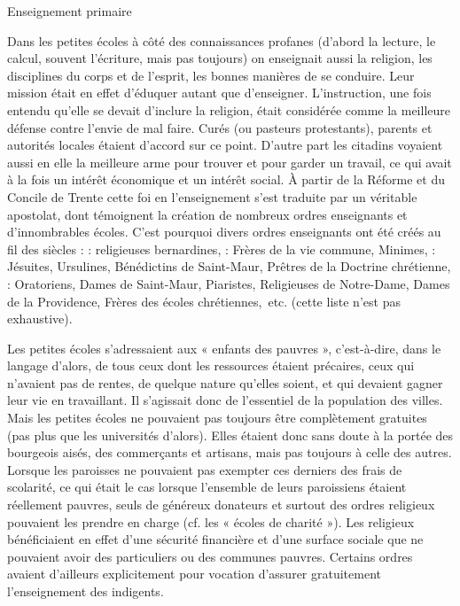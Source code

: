 Enseignement primaire

Dans les petites écoles à côté des connaissances profanes (d'abord la lecture, le calcul, souvent l'écriture, mais pas toujours) on enseignait aussi la religion, les disciplines du corps et de l'esprit, les bonnes manières de se conduire. Leur mission était en effet d'éduquer autant que d'enseigner. L'instruction, une fois entendu qu'elle se devait d'inclure la religion, était considérée comme la meilleure défense contre l'envie de mal faire. Curés (ou pasteurs protestants), parents et autorités locales étaient d'accord sur ce point. D'autre part les citadins voyaient aussi en elle la meilleure arme pour trouver et pour garder un travail, ce qui avait à la fois un intérêt économique et un intérêt social. À partir de la Réforme et du Concile de Trente cette foi en l'enseignement s'est traduite par un véritable apostolat, dont témoignent la création de nombreux ordres enseignants et d'innombrables écoles. C'est pourquoi divers ordres enseignants ont été créés au fil des siècles :
 : religieuses bernardines,
 : Frères de la vie commune, Minimes,
 : Jésuites, Ursulines, Bénédictins de Saint-Maur, Prêtres de la Doctrine chrétienne,
 : Oratoriens, Dames de Saint-Maur, Piaristes, Religieuses de Notre-Dame, Dames de la Providence, Frères des écoles chrétiennes,~etc. (cette liste n'est pas exhaustive).

 Les petites écoles s'adressaient aux « enfants des pauvres », c'est-à-dire, dans le langage d'alors, de tous ceux dont les ressources étaient précaires, ceux qui n'avaient pas de rentes, de quelque nature qu'elles soient, et qui devaient gagner leur vie en travaillant. Il s'agissait donc de l'essentiel de la population des villes. Mais les petites écoles ne pouvaient pas toujours être complètement gratuites (pas plus que les universités d'alors). Elles étaient donc sans doute à la portée des bourgeois aisés, des commerçants et artisans, mais pas toujours à celle des autres. Lorsque les paroisses ne pouvaient pas exempter ces derniers des frais de scolarité, ce qui était le cas lorsque l'ensemble de leurs paroissiens étaient réellement pauvres, seuls de généreux donateurs et surtout des ordres religieux pouvaient les prendre en charge (cf.  les « écoles de charité »). Les religieux bénéficiaient en effet d'une sécurité financière et d'une surface sociale que ne pouvaient avoir des particuliers ou des communes pauvres. Certains ordres avaient d'ailleurs explicitement pour vocation d'assurer gratuitement l'enseignement des indigents.

